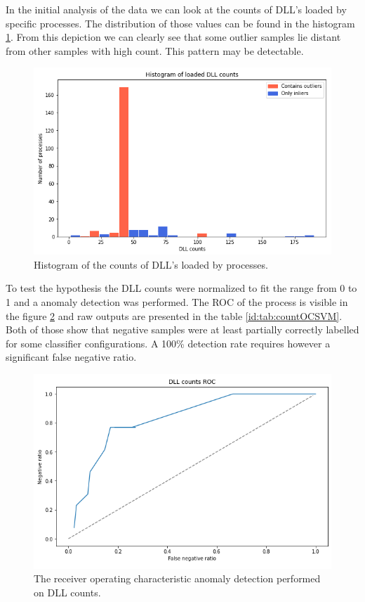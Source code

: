 \documentclass[a4paper,twoside,12pt]{book}
\begin{document}
In the initial analysis of the data we can look at the counts of DLL's loaded by specific 
processes. The distribution of those values can be found in the histogram \ref{fig:dllCounts}. 
From this depiction we can clearly see that some outlier samples lie distant from other 
samples with high count. This pattern may be detectable. 


\begin{figure}
	\centering
	\includegraphics[scale=0.9]{images/DLLcounts}
	\caption{Histogram of the counts of DLL's loaded by processes.}
	\label{fig:dllCounts}
 \end{figure}

To test the hypothesis the DLL counts were normalized to fit the range from 0 to 1 and a anomaly 
detection was performed. The ROC of the process is visible in the figure \ref{fig:DLLcountsROC} and
raw outputs are presented in the table \ref{id:tab:countOCSVM}. Both of those show that 
negative samples were at least partially correctly labelled for some classifier configurations. A 100\%
detection rate requires however a significant false negative ratio.

\begin{figure}
	\centering
	\includegraphics{images/DLLCountsROCKF}
	\caption{The receiver operating characteristic anomaly detection performed on DLL counts.}
	\label{fig:DLLcountsROC}
\end{figure}
\end{document}
